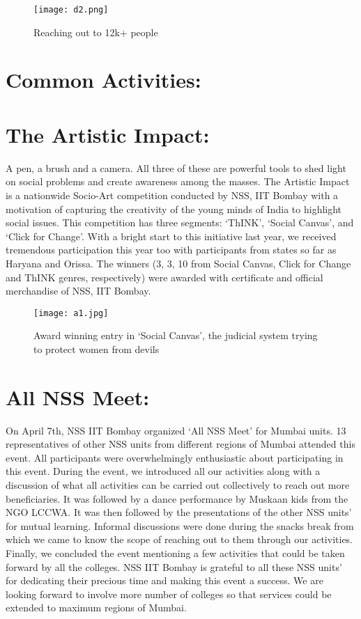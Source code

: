 \begin{figure}[H]
\centering
\texttt{[image: d2.png]}
\caption*{Reaching out to 12k+ people}
\end{figure}

\section*{ \LARGE Common Activities:}
\section*{ The Artistic Impact:} A pen, a brush and a camera. All three of these are powerful tools to shed light on social problems and create awareness among the masses. The Artistic Impact is a nationwide Socio-Art competition conducted by NSS, IIT Bombay with a motivation of capturing the creativity of the young minds of India to highlight social issues. This competition has three segments: ‘ThINK’, ‘Social Canvas’, and ‘Click for Change’. With a bright start to this initiative last year, we received tremendous participation this year too with participants from states so far as Haryana and Orissa. The winners (3, 3, 10 from Social Canvas, Click for Change and ThINK genres, respectively) were awarded with certificate and official merchandise of NSS, IIT Bombay.

\begin{figure}[H]
\centering
\texttt{[image: a1.jpg]}
\caption*{Award winning entry in ‘Social Canvas’, the judicial system trying to protect women from devils
}
\end{figure}

\section*{ All NSS Meet:} On April 7th, NSS IIT Bombay organized ‘All NSS Meet’ for Mumbai units. 13 representatives of other NSS units from different regions of Mumbai attended this event. All participants were overwhelmingly enthusiastic about participating in this event. During the event, we introduced all our activities along with a discussion of what all activities can be carried out collectively to reach out more beneficiaries. It was followed by a dance performance by Muskaan kids from the NGO LCCWA. It was then followed by the presentations of the other NSS units’ for mutual learning. Informal discussions were done during the snacks break from which we came to know the scope of reaching out to them through our activities. Finally, we concluded the event mentioning a few activities that could be taken forward by all the colleges. NSS IIT Bombay is grateful to all these NSS units’ for dedicating their precious time and making this event a success. We are looking forward to involve more number of colleges so that services could be extended to maximum regions of Mumbai.

